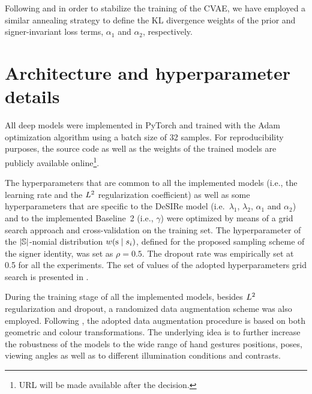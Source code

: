 Following \citet{Bowman2015} and in order to stabilize the training of the CVAE, we have employed a similar annealing strategy to define the KL divergence weights of the prior and signer-invariant loss terms, $\alpha_1$ and $\alpha_2$, respectively.

\section{Architecture and hyperparameter details}
All deep models were implemented in PyTorch and trained with the Adam optimization algorithm using a batch size of 32 samples. For reproducibility purposes, the source code as well as the weights of the trained models are publicly available online\footnote{URL will be made available after the decision.}.

The hyperparameters that are common to all the implemented models (i.e., the learning rate and the $L^2$ regularization coefficient) as well as some hyperparameters that are specific to the DeSIRe model (i.e.\ $\lambda_{1}$, $\lambda_{2}$, $\alpha_{1}$ and $\alpha_{2}$) and to the implemented Baseline~2 (i.e., $\gamma$) were optimized by means of a grid search approach and cross-validation on the training set. The hyperparameter of the $|{\mathbb{S}}|$-nomial distribution $w({\textnormal{s}} \mid s_{i})$, defined for the proposed sampling scheme of the signer identity, was set as $\rho=0.5$. The dropout rate was empirically set at 0.5 for all the experiments. The set of values of the adopted hyperparameters grid search is presented in .

During the training stage of all the implemented models, besides $L^2$ regularization and dropout, a randomized data augmentation scheme was also employed. Following \citet{Ferreira2018}, the adopted data augmentation procedure is based on both geometric and colour transformations. The underlying idea is to further increase the robustness of the models to the wide range of hand gestures positions, poses, viewing angles as well as to different illumination conditions and contrasts.

